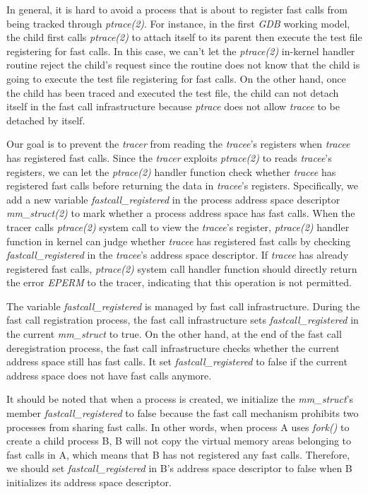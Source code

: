 In general, it is hard to avoid a process that is about to register 
fast calls from being tracked through \emph{ptrace(2)}.  For instance, 
in the first \emph{GDB}  working model, the child first calls \emph{ptrace(2)} to 
attach itself to its parent then execute the test file registering for fast calls. 
In this case, we can't let the \emph{ptrace(2)} in-kernel handler routine reject the child's 
request since the routine does not know that the child is going to execute the test file 
registering for fast calls. On the other hand, once the child has been traced and executed 
the test file, the child can not detach itself in the fast call infrastructure because 
\emph{ptrace} does not allow \emph{tracee} to be detached by itself.

Our goal is to prevent the \emph{tracer} from reading the 
\emph{tracee}'s registers when \emph{tracee} has registered fast calls. 
Since the \emph{tracer} exploits \emph{ptrace(2)} to reads \emph{tracee}'s registers, 
we can let the \emph{ptrace(2)} handler function check whether \emph{tracee} has 
registered fast calls before returning the data in \emph{tracee}'s registers.
Specifically, we add a new variable \emph{fastcall\_registered} 
in the process address space descriptor \emph{mm\_struct(2)}\cite{10.5555/983550} to mark whether a process
address space has fast calls. When the tracer calls \emph{ptrace(2)} system call 
to view the \emph{tracee}'s register, \emph{ptrace(2)} handler function in kernel can judge whether
\emph{tracee} has registered fast calls by checking \emph{fastcall\_registered} in 
the \emph{tracee}'s address space descriptor. If \emph{tracee} has already 
registered fast calls, \emph{ptrace(2)} system call handler function should 
directly return the error \emph{EPERM} to the tracer, indicating that this 
operation is not permitted.

The variable \emph{fastcall\_registered} is managed by fast call 
infrastructure. During the fast call registration process,  
the fast call infrastructure sets \emph{fastcall\_registered} in the current 
\emph{mm\_struct} to true. On the other hand, at the end of the fast call 
deregistration process, the fast call infrastructure checks whether 
the current address space still has fast calls. It set \emph{fastcall\_registered}  
to false if the current address space does not have fast calls anymore.


It should be noted that when a process is created, we initialize 
the \emph{mm\_struct}'s member \emph{fastcall\_registered}  to false because 
the fast call mechanism prohibits two processes from sharing fast calls.
 In other words, when process A uses \emph{fork()}\cite{18} to create a child process B, 
 B will not copy the virtual memory areas\cite{10.5555/983550}  belonging to fast calls in A, 
 which means that B has not registered any fast calls. 
 Therefore, we should set \emph{fastcall\_registered}  in B's address space 
 descriptor to false when B initializes its address space descriptor.

